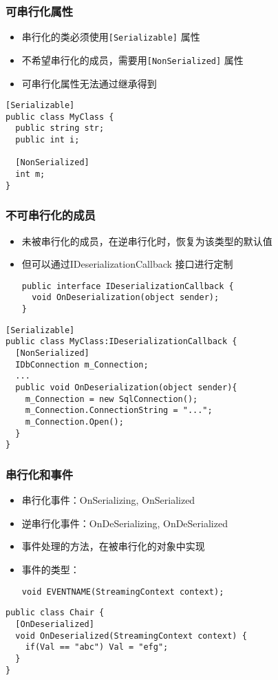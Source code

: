 \begin{frame}[fragile]
\frametitle{可串行化属性}
\begin{itemize}
\item 串行化的类必须使用\texttt{[Serializable]} 属性
\item 不希望串行化的成员，需要用\texttt{[NonSerialized]} 属性
\item 可串行化属性无法通过继承得到
\end{itemize}
\begin{lstlisting}
[Serializable]
public class MyClass {
  public string str;
  public int i;

  [NonSerialized]
  int m;
}
\end{lstlisting}
\end{frame}

\begin{frame}[fragile]
\frametitle{不可串行化的成员}
\begin{itemize}
\item 未被串行化的成员，在逆串行化时，恢复为该类型的默认值
\item 但可以通过IDeserializationCallback 接口进行定制
\begin{lstlisting}
public interface IDeserializationCallback {
  void OnDeserialization(object sender);
}
\end{lstlisting}
\end{itemize}
\begin{lstlisting}
[Serializable]
public class MyClass:IDeserializationCallback {
  [NonSerialized]
  IDbConnection m_Connection;
  ...
  public void OnDeserialization(object sender){
    m_Connection = new SqlConnection();
    m_Connection.ConnectionString = "...";
    m_Connection.Open();
  }
}
\end{lstlisting}
\end{frame}

\begin{frame}[fragile]
\frametitle{串行化和事件}
\begin{itemize}
\item 串行化事件：OnSerializing, OnSerialized
\item 逆串行化事件：OnDeSerializing, OnDeSerialized
\item 事件处理的方法，在被串行化的对象中实现
\item 事件的类型：
\begin{lstlisting}
void EVENTNAME(StreamingContext context);
\end{lstlisting}
\end{itemize}
\begin{lstlisting}
public class Chair {
  [OnDeserialized]
  void OnDeserialized(StreamingContext context) {
    if(Val == "abc") Val = "efg";
  }
}
\end{lstlisting}
\end{frame}

